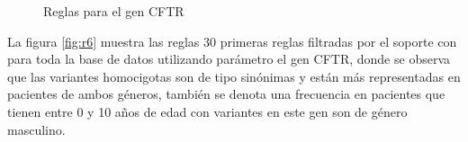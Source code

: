 \begin{figure}[]
	\centering
	\caption{Reglas para el gen CFTR} 
\end{figure}


La figura \ref{fig:r6} muestra las reglas 30 primeras reglas filtradas por el soporte con para toda la base de datos utilizando parámetro el gen CFTR, donde se observa que las variantes homocigotas son de tipo sinónimas y están más representadas en pacientes de ambos géneros, también se denota una frecuencia en pacientes que tienen entre 0 y 10 años de edad con variantes en este gen son de género masculino. \\

